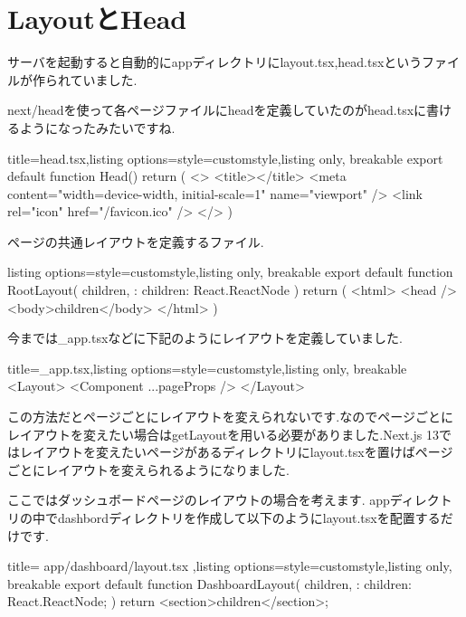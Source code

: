 \section{LayoutとHead}

サーバを起動すると自動的にappディレクトリにlayout.tsx,head.tsxというファイルが作られていました.

next/headを使って各ページファイルにheadを定義していたのがhead.tsxに書けるようになったみたいですね.

\begin{tcblisting}{title={head.tsx},listing options={style=customstyle},listing only, breakable}
  export default function Head() {
      return (
      <>
        <title></title>
        <meta content="width=device-width, initial-scale=1" name="viewport" />
        <link rel="icon" href="/favicon.ico" />
      </>
      )
    }
\end{tcblisting}



ページの共通レイアウトを定義するファイル.




\begin{tcblisting}{listing options={style=customstyle},listing only, breakable}
  export default function RootLayout({
      children,
    }: {
  children: React.ReactNode
  }) {
      return (
      <html>
        <head />
        <body>{children}</body>
      </html>
      )
    }

\end{tcblisting}


今までは\_app.tsxなどに下記のようにレイアウトを定義していました.
\begin{tcblisting}{title={\_app.tsx},listing options={style=customstyle},listing only, breakable}
  <Layout>
    <Component {...pageProps} />
  </Layout>
\end{tcblisting}




この方法だとページごとにレイアウトを変えられないです.なのでページごとにレイアウトを変えたい場合はgetLayoutを用いる必要がありました.Next.js 13ではレイアウトを変えたいページがあるディレクトリにlayout.tsxを置けばページごとにレイアウトを変えられるようになりました.


ここではダッシュボードページのレイアウトの場合を考えます.
appディレクトリの中でdashbordディレクトリを作成して以下のようにlayout.tsxを配置するだけです.



\begin{tcblisting}{title={
        app/dashboard/layout.tsx
      },listing options={style=customstyle},listing only, breakable}
  export default function DashboardLayout({
      children,
    }: {
  children: React.ReactNode;
  }) {
      return <section>{children}</section>;
    }

\end{tcblisting}




